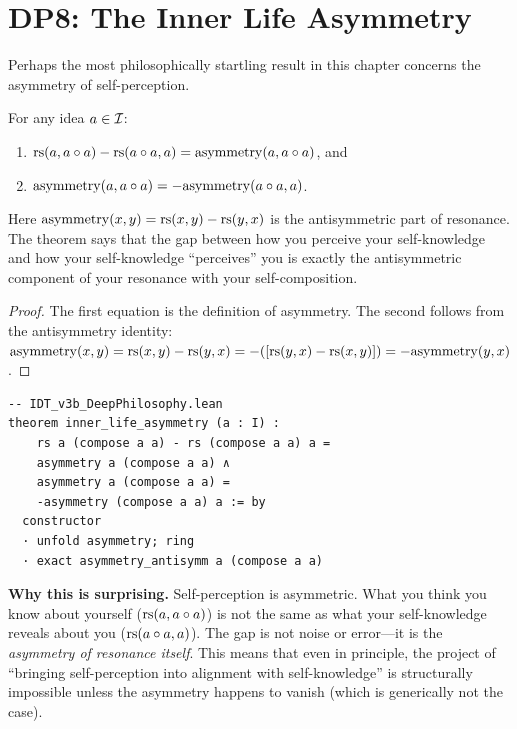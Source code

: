 \section{DP8: The Inner Life Asymmetry}

Perhaps the most philosophically startling result in this chapter
concerns the asymmetry of self-perception.

\begin{theorem}
\label{thm:inner-life-asymmetry}
For any idea $a \in \mathcal{I}$:
\begin{enumerate}
\item $\mathrm{rs}(a, a \circ a) - \mathrm{rs}(a \circ a, a) =
\mathrm{asymmetry}(a, a \circ a)$, and
\item $\mathrm{asymmetry}(a, a \circ a) =
-\mathrm{asymmetry}(a \circ a, a)$.
\end{enumerate}
\end{theorem}

Here $\mathrm{asymmetry}(x, y) = \mathrm{rs}(x, y) - \mathrm{rs}(y, x)$ is the
antisymmetric part of resonance. The theorem says that the gap between
how you perceive your self-knowledge and how your self-knowledge
``perceives'' you is exactly the antisymmetric component of your
resonance with your self-composition.

\begin{proof}
The first equation is the definition of asymmetry. The second follows
from the antisymmetry identity:
$\mathrm{asymmetry}(x, y) = \mathrm{rs}(x,y) - \mathrm{rs}(y,x) = -([\mathrm{rs}(y,x) -
\mathrm{rs}(x,y)]) = -\mathrm{asymmetry}(y, x)$.
\end{proof}

\begin{lstlisting}
-- IDT_v3b_DeepPhilosophy.lean
theorem inner_life_asymmetry (a : I) :
    rs a (compose a a) - rs (compose a a) a =
    asymmetry a (compose a a) ∧
    asymmetry a (compose a a) =
    -asymmetry (compose a a) a := by
  constructor
  · unfold asymmetry; ring
  · exact asymmetry_antisymm a (compose a a)
\end{lstlisting}

\begin{surprisebox}
\textbf{Why this is surprising.} Self-perception is asymmetric. What
you think you know about yourself ($\mathrm{rs}(a, a \circ a)$) is not the
same as what your self-knowledge reveals about you
($\mathrm{rs}(a \circ a, a)$). The gap is not noise or error---it is the
\emph{asymmetry of resonance itself}. This means that even in
principle, the project of ``bringing self-perception into alignment
with self-knowledge'' is structurally impossible unless the asymmetry
happens to vanish (which is generically not the case).
\end{surprisebox}


